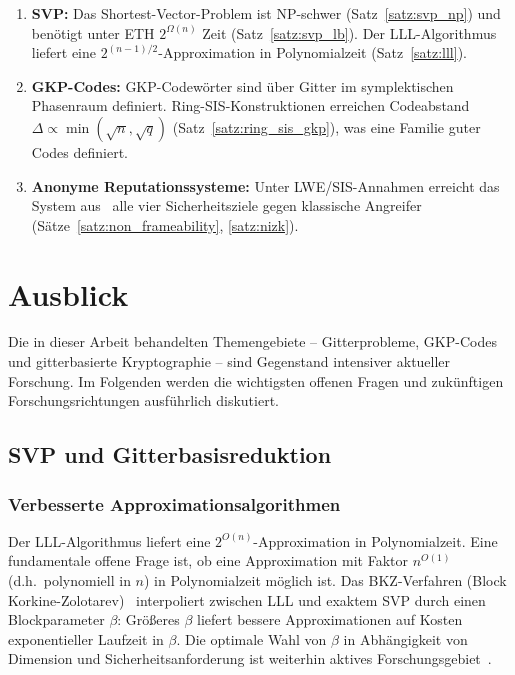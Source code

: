 ﻿\documentclass[a4paper,12pt]{article}
\theoremstyle{definition}
\begin{document}
\begin{enumerate}
    \item \textbf{SVP:}
          Das Shortest-Vector-Problem ist NP-schwer (Satz~\ref{satz:svp_np})
          und benötigt unter ETH $2^{\Omega(n)}$ Zeit (Satz~\ref{satz:svp_lb}).
          Der LLL-Algorithmus liefert eine $2^{(n-1)/2}$-Approximation in Polynomialzeit
          (Satz~\ref{satz:lll}).

    \item \textbf{GKP-Codes:}
          GKP-Codewörter sind über Gitter im symplektischen Phasenraum definiert.
          Ring-SIS-Konstruktionen erreichen Codeabstand $\Delta \propto \min(\sqrt{n}, \sqrt{q})$
          (Satz~\ref{satz:ring_sis_gkp}), was eine Familie guter Codes definiert.

    \item \textbf{Anonyme Reputationssysteme:}
          Unter LWE/SIS-Annahmen erreicht das System aus~\cite{BBP23} alle vier
          Sicherheitsziele gegen klassische Angreifer
          (Sätze~\ref{satz:non_frameability}, \ref{satz:nizk}).
\end{enumerate}

\section{Ausblick}

Die in dieser Arbeit behandelten Themengebiete -- Gitterprobleme, GKP-Codes und
gitterbasierte Kryptographie -- sind Gegenstand intensiver aktueller Forschung.
Im Folgenden werden die wichtigsten offenen Fragen und zukünftigen Forschungsrichtungen
ausführlich diskutiert.

\subsection{SVP und Gitterbasisreduktion}

\subsubsection{Verbesserte Approximationsalgorithmen}

Der LLL-Algorithmus liefert eine $2^{O(n)}$-Approximation in Polynomialzeit.
Eine fundamentale offene Frage ist, ob eine Approximation mit Faktor $n^{O(1)}$
(d.h.\ polynomiell in $n$) in Polynomialzeit möglich ist.
Das BKZ-Verfahren (Block Korkine-Zolotarev)~\cite{Schnorr1994} interpoliert
zwischen LLL und exaktem SVP durch einen Blockparameter $\beta$:
Größeres $\beta$ liefert bessere Approximationen auf Kosten exponentieller
Laufzeit in $\beta$.
Die optimale Wahl von $\beta$ in Abhängigkeit von Dimension und Sicherheitsanforderung
ist weiterhin aktives Forschungsgebiet~\cite{Chen2011}.
\end{document}
